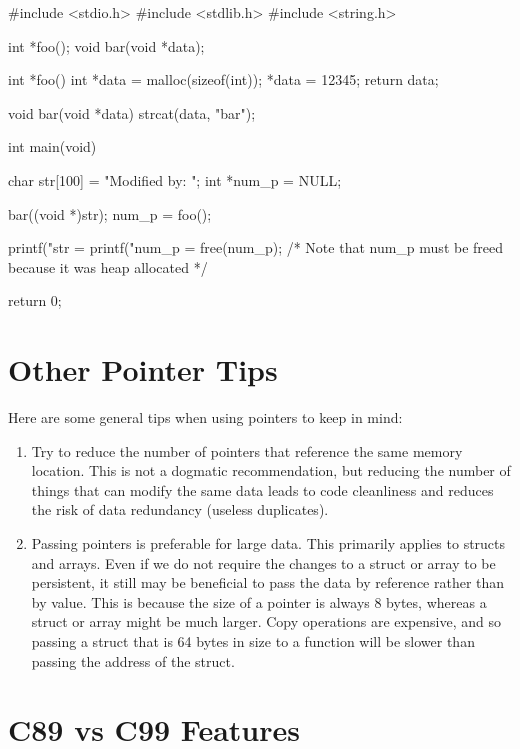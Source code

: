 \documentclass{article}
\begin{document}
\begin{cblk}
#include <stdio.h>
#include <stdlib.h>
#include <string.h>

int *foo();
void bar(void *data);

int *foo()
{
   int *data = malloc(sizeof(int));
   *data = 12345;
   return data;
}

void bar(void *data)
{
   strcat(data, "bar");
}

int main(void)
{
   char str[100] = "Modified by: ";
   int *num_p = NULL;

   bar((void *)str);
   num_p = foo();

   printf("str = %
   printf("num_p = %
   free(num_p); /* Note that num_p must be freed because it was heap allocated */

   return 0;
}
\end{cblk}

\section{Other Pointer Tips}

Here are some general tips when using pointers to keep in mind:

\begin{enumerate}

\item{%
    Try to reduce the number of pointers that reference the same memory location. This is not a dogmatic
    recommendation, but reducing the number of things that can modify the same data leads to code cleanliness
    and reduces the risk of data redundancy (useless duplicates).
}

\item{%
    Passing pointers is preferable for large data. This primarily applies to structs and arrays. Even if we
    do not require the changes to a struct or array to be persistent, it still may be beneficial to pass the
    data by reference rather than by value. This is because the size of a pointer is always 8 bytes, whereas
    a struct or array might be much larger. Copy operations are expensive, and so passing a struct that is 64
    bytes in size to a function will be slower than passing the address of the struct.
}

\end{enumerate}

\section{C89 vs C99 Features}
\end{document}

